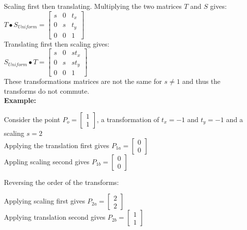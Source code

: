 \documentclass[a4paper,10pt]{scrartcl}
\begin{document}
Scaling first then translating. Multiplying the two matrices $T$ and $S$ gives: \\

$T \bullet S_{Uniform} = \begin{bmatrix}
		  s & 0 & t_x \\
		  0 & s & t_y \\
		  0 & 0 & 1
               \end{bmatrix}
$ \\

Translating first then scaling gives: \\

$S_{Uniform} \bullet T = \begin{bmatrix}
		  s & 0 & st_x \\
		  0 & s & st_y \\
		  0 & 0 & 1
               \end{bmatrix}
$ \\ 

These transformations matrices are not the same for $s \neq 1$ and thus the transforms do not commute. \\ 

{\bfseries{Example:}}

Consider the point $P_o = \begin{bmatrix} 1 \\ 1 \end{bmatrix}$, a transformation of $t_x = -1$ and $t_y = -1$ and a scaling $s = 2$\\
Applying the translation first gives $P_{1a} = \begin{bmatrix} 0 \\ 0 \end{bmatrix}$ \\ 
Appling scaling second gives $P_{1b} = \begin{bmatrix} 0 \\ 0 \end{bmatrix}$

Reversing the order of the transforms:

Applying scaling first gives $P_{2a} = \begin{bmatrix} 2 \\ 2 \end{bmatrix}$ \\
Applying translation second gives  $P_{2b} = \begin{bmatrix} 1 \\ 1 \end{bmatrix}$ \\
\end{document}
